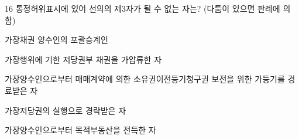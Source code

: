 \begin{question}{16}
통정허위표시에 있어 선의의 제3자가 될 수 없는 자는? (다툼이 있으면 판례에 의함)
\begin{choices}
  \item 가장채권 양수인의 포괄승계인
  \item 가장행위에 기한 저당권부 채권을 가압류한 자
  \item 가장양수인으로부터 매매계약에 의한 소유권이전등기청구권 보전을 위한 가등기를 경료받은 자
  \item 가장저당권의 실행으로 경락받은 자
  \item 가장양수인으로부터 목적부동산을 전득한 자
\end{choices}
\end{question}
\answerall
{}
